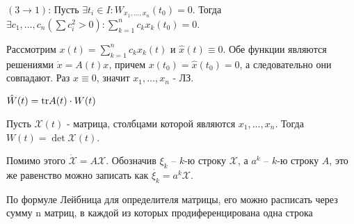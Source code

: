 $(3\rightarrow 1)$: Пусть $\exists t_i \in I: W_{x_1, \dots, x_n}(t_0) = 0$.
Тогда $\exists c_1, \dots, c_n \left(\sum c_i^2 > 0\right): \sum_{k=1}^n c_k x_k(t_0) = 0$.

Рассмотрим $x(t) = \sum_{k=1}^n c_k x_k(t)$ и $\hat{x}(t) \equiv 0$.
Обе функции являются решениями $\dot{x} = A(t)x$, причем $x(t_0) = \hat{x}(t_0) = 0$, а следовательно они совпадают.
Раз $x \equiv 0$, значит $x_1, \dots, x_n$ - ЛЗ.

\Lemma
$\hat{W}(t) = \text{tr} A(t) \cdot W(t)$

\Proof

Пусть $\mathcal{X}(t)$ - матрица, столбцами которой являются $x_1, \dots, x_n$.
Тогда $W(t) = \det \mathcal{X}(t)$.

Помимо этого $\dot{\mathcal{X}} = A\mathcal{X}$.
Обозначив $\xi_k$ -- $k$-ю строку $\mathcal{X}$, а $a^k$ -- $k$-ю строку $A$, это же равенство можно записать как $\dot{\xi_k} = a^k \mathcal{X}$.

По формуле Лейбница для определителя матрицы, его можно расписать через сумму n матриц, в каждой из которых продиференцирована одна строка

